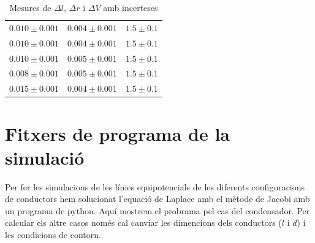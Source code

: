 \documentclass[11pt]{article}
\begin{document}
\begin{table}[ht]
\begin{tabular}{ccc}
        $0.010 \pm 0.001$ & $0.004 \pm 0.001$ & $1.5 \pm 0.1$ \\
        $0.010 \pm 0.001$ & $0.004 \pm 0.001$ & $1.5 \pm 0.1$ \\
        $0.010 \pm 0.001$ & $0.005 \pm 0.001$ & $1.5 \pm 0.1$ \\
        $0.008 \pm 0.001$ & $0.005 \pm 0.001$ & $1.5 \pm 0.1$ \\
        $0.015 \pm 0.001$ & $0.004 \pm 0.001$ & $1.5 \pm 0.1$ \\
        \hline
    \end{tabular}
    \caption{Mesures de $\Delta l$, $\Delta r$ i $\Delta V$ amb incerteses}
    \label{tab:mesures}
\end{table}

\section{Fitxers de programa de la simulació}\label{sec: python}
Per fer les simulacions de les línies equipotencials de les diferents configuracions de conductors hem solucionat l'equació de Laplace amb el mètode de Jacobi amb un programa de python. Aquí mostrem el probrama pel cas del condensador. Per calcular els altre casos només cal canviar les dimencions dels conductors ($l$ i $d$) i les condicions de contorn.
\end{document}

